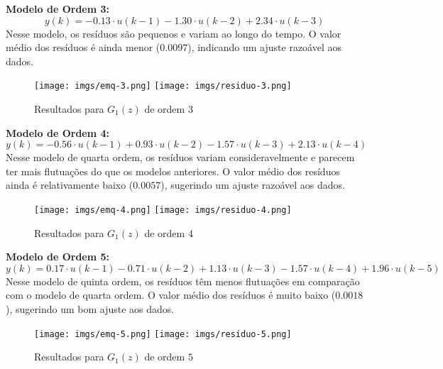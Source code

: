 \documentclass[a4paper,12pt]{article}
\begin{document}
\newpage
\noindent \textbf{Modelo de Ordem 3:}
\begin{equation*}
y(k) = -0.13 \cdot u(k-1) - 1.30 \cdot u(k-2) + 2.34 \cdot u(k-3)\tag{4.4.1.3}
\end{equation*}
Nesse modelo, os resíduos são pequenos e variam ao longo do tempo. O valor médio dos resíduos é ainda menor ($0.0097$), indicando um ajuste razoável aos dados.

\begin{figure}[h!]
\begin{center}
	\texttt{[image: imgs/emq-3.png]} \quad
	\texttt{[image: imgs/residuo-3.png]}
\caption{Resultados para $G_1(z)$ de ordem $3$} \label{fig8}
\end{center}
\end{figure}

\noindent \textbf{Modelo de Ordem 4:}
\begin{equation*}
   y(k) = -0.56 \cdot u(k-1) + 0.93 \cdot u(k-2) - 1.57 \cdot u(k-3) + 2.13 \cdot u(k-4)\tag{4.4.1.4}
\end{equation*}
Nesse modelo de quarta ordem, os resíduos variam consideravelmente e parecem ter mais flutuações do que os modelos anteriores. O valor médio dos resíduos ainda é relativamente baixo ($0.0057$), sugerindo um ajuste razoável aos dados.

\begin{figure}[h!]
\begin{center}
	\texttt{[image: imgs/emq-4.png]} \quad
	\texttt{[image: imgs/residuo-4.png]}
\caption{Resultados para $G_1(z)$ de ordem $4$} \label{fig9}
\end{center}
\end{figure}

\newpage
\noindent \textbf{Modelo de Ordem 5:}
\begin{equation*}
    y(k) = 0.17 \cdot u(k-1) - 0.71 \cdot u(k-2) + 1.13 \cdot u(k-3) - 1.57 \cdot u(k-4) + 1.96 \cdot u(k-5)\tag{4.4.1.5}
\end{equation*}
Nesse modelo de quinta ordem, os resíduos têm menos flutuações em comparação com o modelo de quarta ordem. O valor médio dos resíduos é muito baixo ($0.0018$), sugerindo um bom ajuste aos dados.

\begin{figure}[h!]
\begin{center}
	\texttt{[image: imgs/emq-5.png]} \quad
	\texttt{[image: imgs/resíduo-5.png]}
\caption{Resultados para $G_1(z)$ de ordem $5$} \label{fig10}
\end{center}
\end{figure}
\end{document}
